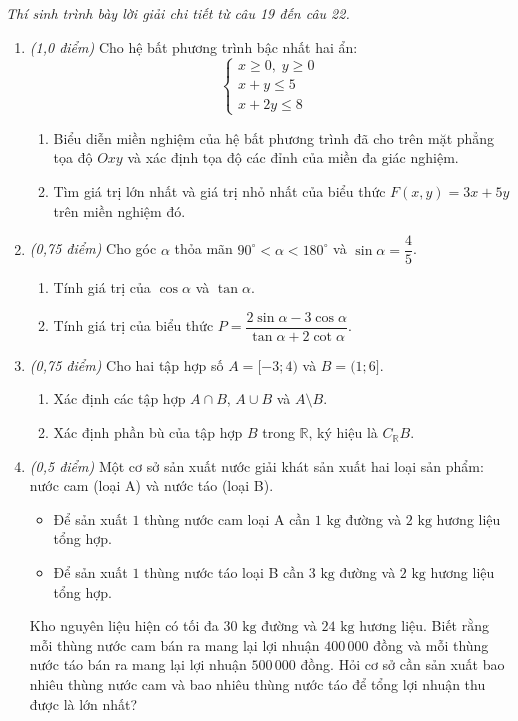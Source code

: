 \documentclass[12pt,a4paper]{article}
\newcommand{\parttitle}[1]{\par\vspace{2pt}{\large\bfseries\color{ink}#1}\par\vspace{1pt}}
\begin{document}
\parttitle{PHẦN IV. Tự luận}
\textit{Thí sinh trình bày lời giải chi tiết từ câu 19 đến câu 22.}
\begin{enumerate}[resume]
\item \textit{(1,0 điểm)} Cho hệ bất phương trình bậc nhất hai ẩn:
\[
\begin{cases}
x \ge 0,\; y \ge 0 \\
x + y \le 5 \\
x + 2y \le 8
\end{cases}
\]
\begin{enumerate}
    \item Biểu diễn miền nghiệm của hệ bất phương trình đã cho trên mặt phẳng tọa độ $Oxy$ và xác định tọa độ các đỉnh của miền đa giác nghiệm.
    \item Tìm giá trị lớn nhất và giá trị nhỏ nhất của biểu thức $F(x, y) = 3x + 5y$ trên miền nghiệm đó.
\end{enumerate}

\item \textit{(0,75 điểm)} Cho góc $\alpha$ thỏa mãn $90^\circ < \alpha < 180^\circ$ và $\sin \alpha = \dfrac{4}{5}$.
\begin{enumerate}
    \item Tính giá trị của $\cos \alpha$ và $\tan \alpha$.
    \item Tính giá trị của biểu thức $P = \dfrac{2\sin \alpha - 3\cos \alpha}{\tan \alpha + 2\cot \alpha}$.
\end{enumerate}

\item \textit{(0,75 điểm)} Cho hai tập hợp số $A = [-3; 4)$ và $B = (1; 6]$.
\begin{enumerate}
    \item Xác định các tập hợp $A \cap B$, $A \cup B$ và $A \setminus B$.
    \item Xác định phần bù của tập hợp $B$ trong $\mathbb{R}$, ký hiệu là $C_{\mathbb{R}} B$.
\end{enumerate}

\item \textit{(0,5 điểm)} Một cơ sở sản xuất nước giải khát sản xuất hai loại sản phẩm: nước cam (loại A) và nước táo (loại B).
\begin{itemize}[leftmargin=0.5cm]
    \item Để sản xuất $1$ thùng nước cam loại A cần $1\text{ kg}$ đường và $2\text{ kg}$ hương liệu tổng hợp.
    \item Để sản xuất $1$ thùng nước táo loại B cần $3\text{ kg}$ đường và $2\text{ kg}$ hương liệu tổng hợp.
\end{itemize}
Kho nguyên liệu hiện có tối đa $30\text{ kg}$ đường và $24\text{ kg}$ hương liệu. Biết rằng mỗi thùng nước cam bán ra mang lại lợi nhuận $400\,000$ đồng và mỗi thùng nước táo bán ra mang lại lợi nhuận $500\,000$ đồng. Hỏi cơ sở cần sản xuất bao nhiêu thùng nước cam và bao nhiêu thùng nước táo để tổng lợi nhuận thu được là lớn nhất?
\end{enumerate}
\end{document}

